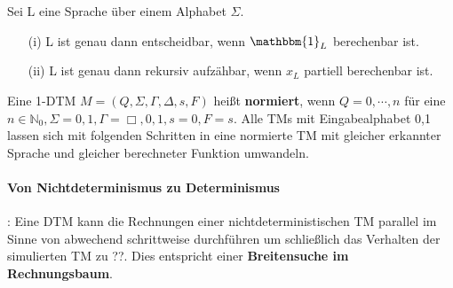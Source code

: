   Sei L eine Sprache über einem Alphabet \(\Sigma\). 
  \begin{itemize}
    \item [(i)] L ist genau dann entscheidbar, wenn \(\mathbbm{1}_L\) berechenbar ist.
    \item [(ii)] L ist genau dann rekursiv aufzähbar, wenn \(x_L\) partiell berechenbar ist.
  \end{itemize}

\newpage

  Eine 1-DTM \(M = (Q, \Sigma, \Gamma, \Delta, s, F)\) heißt \textbf{normiert}, wenn \(Q = {0,\cdots, n}\) für eine \(n \in \mathbb{N}_{0}, \Sigma = {0, 1}, \Gamma = {\Box, 0, 1}, s = 0, F = {s}\). Alle TMs mit Eingabealphabet {0,1} lassen sich mit folgenden Schritten in eine normierte TM mit gleicher erkannter Sprache und gleicher berechneter Funktion umwandeln. 
  \paragraph*{Von Nichtdeterminismus zu Determinismus}: Eine DTM kann die Rechnungen einer nichtdeterministischen TM parallel im Sinne von abwechend schrittweise durchführen um schließlich das Verhalten der simulierten TM zu ??. Dies entspricht einer \textbf{Breitensuche im Rechnungsbaum}.
  {}


